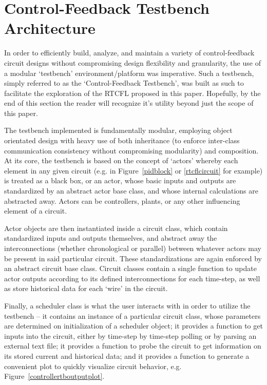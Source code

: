 \documentclass[10pt,twocolumn,letterpaper]{article}
\begin{document}
    \section{Control-Feedback Testbench Architecture} \label{tbarch}

        In order to efficiently build, analyze, and maintain a variety of control-feedback circuit designs without
        compromising design flexibility and granularity, the use of a modular `testbench' environment/platform was
        imperative. Such a testbench, simply referred to as the `Control-Feedback Testbench', was built as such to
        facilitate the exploration of the RTCFL proposed in this paper. Hopefully, by the end of this section the reader
        will recognize it's utility beyond just the scope of this paper.

        The testbench implemented is fundamentally modular, employing object orientated design with heavy use of both
        inheritance (to enforce inter-class communication consistency without compromising modularity) and composition.
        At its core, the testbench is based on the concept of `actors' whereby each element in any given circuit (e.g.
        in Figure~\ref{pidblock} or \ref{rtcflcircuit} for example) is treated as a black box, or an actor, whose basic
        inputs and outputs are standardized by an abstract actor base class, and whose internal calculations are
        abstracted away. Actors can be controllers, plants, or any other influencing element of a circuit. 
        
        Actor objects are then instantiated inside a circuit class, which contain standardized inputs and outputs
        themselves, and abstract away the interconnections (whether chronological or parallel) between whatever actors
        may be present in said particular circuit. These standardizations are again enforced by an abstract circuit base
        class. Circuit classes contain a single function to update actor outputs according to its defined
        interconnections for each time-step, as well as store historical data for each `wire' in the circuit.
        
        Finally, a scheduler class is what the user interacts with in order to utilize the testbench -- it contains an
        instance of a particular circuit class, whose parameters are determined on initialization of a scheduler object;
        it provides a function to get inputs into the circuit, either by time-step by time-step polling or by parsing an
        external text file; it provides a function to probe the circuit to get information on its stored current and
        historical data; and it provides a function to generate a convenient plot to quickly visualize circuit behavior,
        e.g. Figure~\ref{controllertboutputplot}.
        
\end{document}
